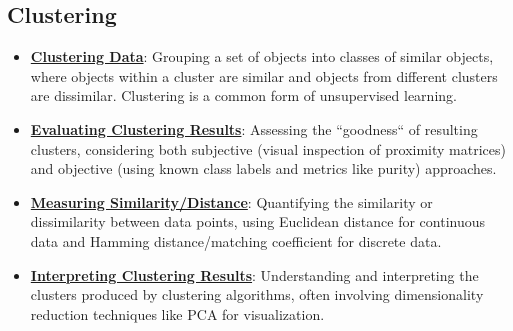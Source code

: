 \documentclass{article}%
\begin{document}
\subsection{Clustering}%
\label{subsec:Clustering}%
\begin{itemize}[leftmargin=*]%
\item \href{https://purdue.brightspace.com/d2l/common/assets/pdfjs-d2l-dist/1.0.14-legacy/web/viewer.html?file=\%2Fcontent\%2Fenforced\%2F1095467-wl.202510.CS.24300.001\%2F12L2-distance-clusters.pdf\%3Fou\%3D1095467\&lang=en-us\&container=d2l-fileviewer-rendered-pdf\&fullscreen=d2l-fileviewer-rendered-pdf-dialog\&height=667#page=4}{\textbf{Clustering Data}}: Grouping a set of objects into classes of similar objects, where objects within a cluster are similar and objects from different clusters are dissimilar. Clustering is a common form of unsupervised learning.%
\item \href{https://purdue.brightspace.com/d2l/common/assets/pdfjs-d2l-dist/1.0.14-legacy/web/viewer.html?file=\%2Fcontent\%2Fenforced\%2F1095467-wl.202510.CS.24300.001\%2F12L2-distance-clusters.pdf\%3Fou\%3D1095467\&lang=en-us\&container=d2l-fileviewer-rendered-pdf\&fullscreen=d2l-fileviewer-rendered-pdf-dialog\&height=667#page=32}{\textbf{Evaluating Clustering Results}}: Assessing the ``goodness`` of resulting clusters, considering both subjective (visual inspection of proximity matrices) and objective (using known class labels and metrics like purity) approaches.%
\item \href{https://purdue.brightspace.com/d2l/common/assets/pdfjs-d2l-dist/1.0.14-legacy/web/viewer.html?file=\%2Fcontent\%2Fenforced\%2F1095467-wl.202510.CS.24300.001\%2F12L2-distance-clusters.pdf\%3Fou\%3D1095467\&lang=en-us\&container=d2l-fileviewer-rendered-pdf\&fullscreen=d2l-fileviewer-rendered-pdf-dialog\&height=667#page=17}{\textbf{Measuring Similarity/Distance}}: Quantifying the similarity or dissimilarity between data points, using Euclidean distance for continuous data and Hamming distance/matching coefficient for discrete data.%
\item \href{https://purdue.brightspace.com/d2l/common/assets/pdfjs-d2l-dist/1.0.14-legacy/web/viewer.html?file=\%2Fcontent\%2Fenforced\%2F1095467-wl.202510.CS.24300.001\%2F12L2-distance-clusters.pdf\%3Fou\%3D1095467\&lang=en-us\&container=d2l-fileviewer-rendered-pdf\&fullscreen=d2l-fileviewer-rendered-pdf-dialog\&height=667#page=36}{\textbf{Interpreting Clustering Results}}: Understanding and interpreting the clusters produced by clustering algorithms, often involving dimensionality reduction techniques like PCA for visualization.%
\end{itemize}
\end{document}
